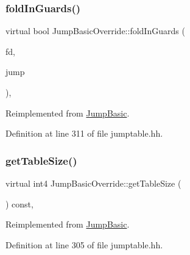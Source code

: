 \subsubsection{\texorpdfstring{foldInGuards()}{foldInGuards()}}
{\footnotesize\ttfamily virtual bool Jump\+Basic\+Override\+::fold\+In\+Guards (\begin{DoxyParamCaption}\item[{\mbox{\hyperlink{class_funcdata}{Funcdata}} $\ast$}]{fd,  }\item[{\mbox{\hyperlink{class_jump_table}{Jump\+Table}} $\ast$}]{jump }\end{DoxyParamCaption})\hspace{0.3cm}{\ttfamily [inline]}, {\ttfamily [virtual]}}



Reimplemented from \mbox{\hyperlink{class_jump_basic_ae70d6baeeecb4b16e79de8516868ffe4}{Jump\+Basic}}.



Definition at line 311 of file jumptable.\+hh.

\mbox{\label{class_jump_basic_override_a49b889abc5b5f57fe22b6cbc17e03f64}} 
\subsubsection{\texorpdfstring{getTableSize()}{getTableSize()}}
{\footnotesize\ttfamily virtual int4 Jump\+Basic\+Override\+::get\+Table\+Size (\begin{DoxyParamCaption}\item[{void}]{ }\end{DoxyParamCaption}) const\hspace{0.3cm}{\ttfamily [inline]}, {\ttfamily [virtual]}}



Reimplemented from \mbox{\hyperlink{class_jump_basic_abef7f04911739ec301f393f072a1c9c5}{Jump\+Basic}}.



Definition at line 305 of file jumptable.\+hh.

\mbox{\label{class_jump_basic_override_a5ab5ce54ef01c3839fe62f97c967cbd2}} 
